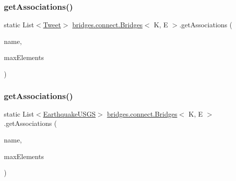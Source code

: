 \subsubsection{\texorpdfstring{get\+Associations()}{getAssociations()}\hspace{0.1cm}{\footnotesize\ttfamily [1/2]}}
{\footnotesize\ttfamily static List$<$\hyperlink{classbridges_1_1data__src__dependent_1_1_tweet}{Tweet}$>$ \hyperlink{classbridges_1_1connect_1_1_bridges}{bridges.\+connect.\+Bridges}$<$ K, E $>$.get\+Associations (\begin{DoxyParamCaption}\item[{\hyperlink{classbridges_1_1data__src__dependent_1_1_twitter_account}{Twitter\+Account}}]{name,  }\item[{int}]{max\+Elements }\end{DoxyParamCaption})\hspace{0.3cm}{\ttfamily [static]}}

\hypertarget{classbridges_1_1connect_1_1_bridges_ac02211d6205c1270df11fcc271982d40}{}\label{classbridges_1_1connect_1_1_bridges_ac02211d6205c1270df11fcc271982d40} 
\subsubsection{\texorpdfstring{get\+Associations()}{getAssociations()}\hspace{0.1cm}{\footnotesize\ttfamily [2/2]}}
{\footnotesize\ttfamily static List$<$\hyperlink{classbridges_1_1data__src__dependent_1_1_earthquake_u_s_g_s}{Earthquake\+U\+S\+GS}$>$ \hyperlink{classbridges_1_1connect_1_1_bridges}{bridges.\+connect.\+Bridges}$<$ K, E $>$.get\+Associations (\begin{DoxyParamCaption}\item[{\hyperlink{classbridges_1_1data__src__dependent_1_1_u_s_g_saccount}{U\+S\+G\+Saccount}}]{name,  }\item[{int}]{max\+Elements }\end{DoxyParamCaption})\hspace{0.3cm}{\ttfamily [static]}}

\hypertarget{classbridges_1_1connect_1_1_bridges_afd68bf25a3f61e731f603da67fbdcecc}{}\label{classbridges_1_1connect_1_1_bridges_afd68bf25a3f61e731f603da67fbdcecc} 
